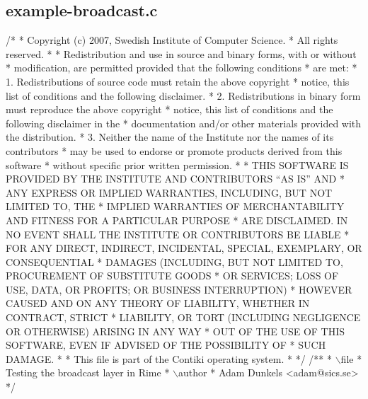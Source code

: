 \hypertarget{a00016}{}\subsection{example-\/broadcast.\+c}

\begin{DoxyCodeInclude}
\textcolor{comment}{/*}
\textcolor{comment}{ * Copyright (c) 2007, Swedish Institute of Computer Science.}
\textcolor{comment}{ * All rights reserved.}
\textcolor{comment}{ *}
\textcolor{comment}{ * Redistribution and use in source and binary forms, with or without}
\textcolor{comment}{ * modification, are permitted provided that the following conditions}
\textcolor{comment}{ * are met:}
\textcolor{comment}{ * 1. Redistributions of source code must retain the above copyright}
\textcolor{comment}{ *    notice, this list of conditions and the following disclaimer.}
\textcolor{comment}{ * 2. Redistributions in binary form must reproduce the above copyright}
\textcolor{comment}{ *    notice, this list of conditions and the following disclaimer in the}
\textcolor{comment}{ *    documentation and/or other materials provided with the distribution.}
\textcolor{comment}{ * 3. Neither the name of the Institute nor the names of its contributors}
\textcolor{comment}{ *    may be used to endorse or promote products derived from this software}
\textcolor{comment}{ *    without specific prior written permission.}
\textcolor{comment}{ *}
\textcolor{comment}{ * THIS SOFTWARE IS PROVIDED BY THE INSTITUTE AND CONTRIBUTORS ``AS IS'' AND}
\textcolor{comment}{ * ANY EXPRESS OR IMPLIED WARRANTIES, INCLUDING, BUT NOT LIMITED TO, THE}
\textcolor{comment}{ * IMPLIED WARRANTIES OF MERCHANTABILITY AND FITNESS FOR A PARTICULAR PURPOSE}
\textcolor{comment}{ * ARE DISCLAIMED.  IN NO EVENT SHALL THE INSTITUTE OR CONTRIBUTORS BE LIABLE}
\textcolor{comment}{ * FOR ANY DIRECT, INDIRECT, INCIDENTAL, SPECIAL, EXEMPLARY, OR CONSEQUENTIAL}
\textcolor{comment}{ * DAMAGES (INCLUDING, BUT NOT LIMITED TO, PROCUREMENT OF SUBSTITUTE GOODS}
\textcolor{comment}{ * OR SERVICES; LOSS OF USE, DATA, OR PROFITS; OR BUSINESS INTERRUPTION)}
\textcolor{comment}{ * HOWEVER CAUSED AND ON ANY THEORY OF LIABILITY, WHETHER IN CONTRACT, STRICT}
\textcolor{comment}{ * LIABILITY, OR TORT (INCLUDING NEGLIGENCE OR OTHERWISE) ARISING IN ANY WAY}
\textcolor{comment}{ * OUT OF THE USE OF THIS SOFTWARE, EVEN IF ADVISED OF THE POSSIBILITY OF}
\textcolor{comment}{ * SUCH DAMAGE.}
\textcolor{comment}{ *}
\textcolor{comment}{ * This file is part of the Contiki operating system.}
\textcolor{comment}{ *}
\textcolor{comment}{ */}
\textcolor{comment}{}
\textcolor{comment}{/**}
\textcolor{comment}{ * \(\backslash\)file}
\textcolor{comment}{ *         Testing the broadcast layer in Rime}
\textcolor{comment}{ * \(\backslash\)author}
\textcolor{comment}{ *         Adam Dunkels <adam@sics.se>}
\textcolor{comment}{ */}


\end{DoxyCodeInclude}
